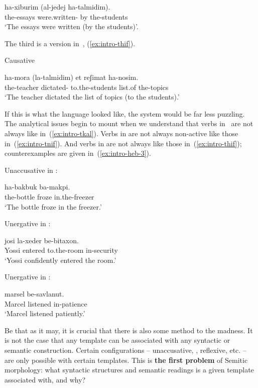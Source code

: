 \begin{exe}
\begin{xlist}
\begin{exe}
\begin{exe}
 		\gll  ha-xiburim  (al-jedej ha-talmidim).\\
 		  the-essays were.written- by the-students\\
 		\glt `The essays were written (by the students)'. 
	
 \z 

The third is a  version in~{\thif}, (\ref{ex:intro-thif}).
 \begin{exe}
\ex  \label{ex:intro-thif}Causative {\thif} 
		
 		\gll  ha-mora  (la-talmidim) et reʃimat ha-nosim.\\
 		  the-teacher dictated- to.the-students  list.of the-topics\\
 		\glt `The teacher dictated the list of topics (to the students).' 
	
 \z 

If this is what the language looked like, the system would be far less puzzling. The analytical issues begin to mount when we understand that verbs in~{\tkal} are not always  like in~(\ref{ex:intro-tkal}). Verbs in {\tnif} are not always non-active like those in~(\ref{ex:intro-tnif}). And verbs in {\thif} are not always  like those in~(\ref{ex:intro-thif}); counterexamples are given in~(\ref{ex:intro-heb-3}).
 \begin{exe}
 \ex  \label{ex:intro-heb-3}
 \begin{xlist} 
 	\ex  Unaccusative in {\tkal}: 
		
 		\gll  ha-bakbuk  ba-makpi.\\
 		  the-bottle froze in.the-freezer\\
 		\glt `The bottle froze in the freezer.' 
		
 	\ex  Unergative in {\tnif}: 
		
 		\gll  josi  la-xeder be-bitaxon.\\
 		  Yossi entered to.the-room in-security\\
 		\glt `Yossi confidently entered the room.' 
	
 	\ex  Unergative in {\thif}: 
		
 		\gll  marsel  be-savlanut.\\
 		  Marcel listened in-patience\\
 		\glt `Marcel listened patiently.' 
	
 \z
\z 

Be that as it may, it is crucial that there is also some method to the madness. It is not the case that any template can be associated with any syntactic or semantic construction. Certain configurations -- unaccusative, , reflexive, etc. -- are only possible with certain templates. This is \textbf{the first problem} of Semitic morphology: what syntactic structures and semantic readings is a given template associated with, and why?


\end{xlist}
\end{exe}
\end{exe}
\end{exe}
\end{exe}
\end{xlist}
\end{exe}
